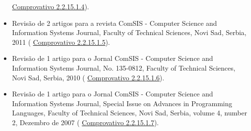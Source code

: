 \documentclass[11pt]{article}
\begin{document}
\begin{itemize}
{\href{run:ComprovativosCOCP/revisoes/ComSIS2013.pdf}{Comprovativo 2.2.15.1.4}).}
\item{Revisão de 2 artigos para a revista ComSIS - Computer Science and Information Systems Journal, Faculty of Technical Sciences, Novi Sad, Serbia, 2011 (
\href{run:ComprovativosCOCP/revisoes/ComSIS2011.pdf}{Comprovativo 2.2.15.1.5}).}
\item{Revisão de 1 artigo para o Jornal ComSIS - Computer Science and Information Systems Journal, No. 135-0812, Faculty of Technical Sciences, Novi Sad, Serbia, 2010 (
\href{run:ComprovativosCOCP/revisoes/ComSIS2010.pdf}{Comprovativo 2.2.15.1.6}).}
\item{Revisão de 1 artigo para o Jornal ComSIS - Computer Science and Information Systems Journal, Special Issue on Advances in Programming Languages, Faculty of Technical Sciences, Novi Sad, Serbia, volume 4, number 2, Dezembro de 2007 (
\href{run:ComprovativosCOCP/revisoes/ComSIS2007.pdf}{Comprovativo 2.2.15.1.7}).}
\end{itemize}
 \\
\end{document}
